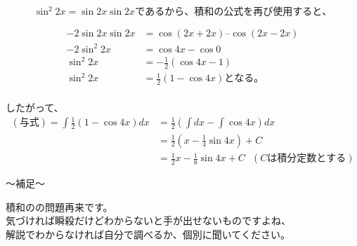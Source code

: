 \documentclass[12pt,a4paper]{jsarticle}
\begin{document}
\begin{equation*}
    \sin^2{2x} = \sin{2x}\sin{2x}であるから、積和の公式を再び使用すると、
\end{equation*}

\begin{align*}
    -2\sin{2x}\sin{2x} &= \cos(2x+2x) – \cos(2x-2x) \\
    -2\sin^2{2x} &= \cos{4x} - \cos{0} \\
    \sin^2{2x} &= -\frac{1}{2}(\cos4x - 1) \\
    \sin^2{2x} &= \frac{1}{2}(1 - \cos{4x})となる。 \\
\end{align*}

したがって、\\
\begin{align*}    
    (与式) = \int\frac{1}{2}(1 - \cos{4x}) dx
    &= \frac{1}{2}(\int{dx} - \int\cos{4x})dx \\
    &= \frac{1}{2}(x - \frac{1}{4}\sin{4x}) + C \\
    &= \frac{1}{2}x - \frac{1}{8}\sin{4x} + C ~~~(Cは積分定数とする)
\end{align*}

\begin{boxnote}
    〜補足〜
    \begin{center}
        積和のの問題再来です。\\
        気づければ瞬殺だけどわからないと手が出せないものですよね、 \\
        解説でわからなければ自分で調べるか、個別に聞いてください。
    \end{center}
\end{boxnote}
\end{document}

